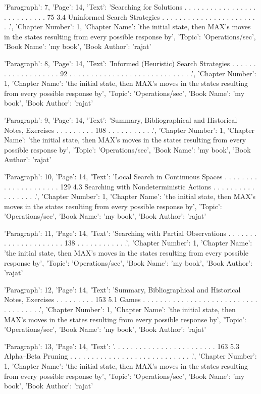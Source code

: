{'Paragraph': 7, 'Page': 14, 'Text': 'Searching for Solutions . . . . . . . . . . . . . . . . . . . . . . . . . . . 75 3.4 Uninformed Search Strategies . . . . . . . . . . . . . . . . . . . . . . . .', 'Chapter Number': 1, 'Chapter Name': 'the initial state, then MAX’s moves in the states resulting from every possible response by', 'Topic': 'Operations/sec', 'Book Name': 'my book', 'Book Author': 'rajat'}

{'Paragraph': 8, 'Page': 14, 'Text': 'Informed (Heuristic) Search Strategies . . . . . . . . . . . . . . . . . . . 92 . . . . . . . . . . . . . . . . . . . . . . . . . . . . .', 'Chapter Number': 1, 'Chapter Name': 'the initial state, then MAX’s moves in the states resulting from every possible response by', 'Topic': 'Operations/sec', 'Book Name': 'my book', 'Book Author': 'rajat'}

{'Paragraph': 9, 'Page': 14, 'Text': 'Summary, Bibliographical and Historical Notes, Exercises . . . . . . . . . 108 . . . . . . . . . . .', 'Chapter Number': 1, 'Chapter Name': 'the initial state, then MAX’s moves in the states resulting from every possible response by', 'Topic': 'Operations/sec', 'Book Name': 'my book', 'Book Author': 'rajat'}

{'Paragraph': 10, 'Page': 14, 'Text': 'Local Search in Continuous Spaces . . . . . . . . . . . . . . . . . . . . . 129 4.3 Searching with Nondeterministic Actions . . . . . . . . . . . . . . . . . .', 'Chapter Number': 1, 'Chapter Name': 'the initial state, then MAX’s moves in the states resulting from every possible response by', 'Topic': 'Operations/sec', 'Book Name': 'my book', 'Book Author': 'rajat'}

{'Paragraph': 11, 'Page': 14, 'Text': 'Searching with Partial Observations . . . . . . . . . . . . . . . . . . . . . 138 . . . . . . . . . . . .', 'Chapter Number': 1, 'Chapter Name': 'the initial state, then MAX’s moves in the states resulting from every possible response by', 'Topic': 'Operations/sec', 'Book Name': 'my book', 'Book Author': 'rajat'}

{'Paragraph': 12, 'Page': 14, 'Text': 'Summary, Bibliographical and Historical Notes, Exercises . . . . . . . . . 153 5.1 Games . . . . . . . . . . . . . . . . . . . . . . . . . . . . . . . . . . . .', 'Chapter Number': 1, 'Chapter Name': 'the initial state, then MAX’s moves in the states resulting from every possible response by', 'Topic': 'Operations/sec', 'Book Name': 'my book', 'Book Author': 'rajat'}

{'Paragraph': 13, 'Page': 14, 'Text': '. . . . . . . . . . . . . . . . . . . . . . . . 163 5.3 Alpha–Beta Pruning . . . . . . . . . . . . . . . . . . . . . . . . . . . . .', 'Chapter Number': 1, 'Chapter Name': 'the initial state, then MAX’s moves in the states resulting from every possible response by', 'Topic': 'Operations/sec', 'Book Name': 'my book', 'Book Author': 'rajat'}

